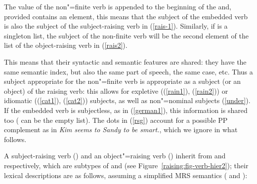 \eal
\label{rsg}
\ex {} \impl
\avm{ [ \argst  \1 \+ < \ldots, [subj & \1 ] >  ]} \label{rais-1}
\ex {}  \impl
\avm{ [ \argst  < NP > \+ \1 \+ < [subj & \1 ] > ]} \label{rais2}
\zl

\noindent
The \subj value of the non"=finite verb is appended to the beginning of the \argst and, provided
 contains an element, this means that the subject of the embedded verb is also the subject
of the subject-raising verb in (\ref{rais-1}). Similarly, if  is a singleton list, the subject of the
non-finite verb will be the second element of the \argst list of the object-raising verb in (\ref{rais2}).

This means that  their syntactic and semantic features are shared: they have the
same semantic index, but also the same part of speech, the same case, etc. Thus a subject appropriate for the
non"=finite verb is appropriate as a subject (or an object) of the raising verb: this allows for
expletive ((\ref{rain1}), (\ref{rain2})) or idiomatic ((\ref{cat1}), (\ref{cat2})) subjects, as well
as non"=nominal subjects (\ref{under}). If the embedded verb is subjectless, as in (\ref{german1}),
this information is shared too ( can be the empty list). The dots in (\ref{rsg}) account for
a possible PP complement as in \textit{Kim seems to Sandy to be smart.}, which we ignore in what
follows.

A subject-raising verb () and an object"=raising verb () inherit from
 and 
 respectively, which are subtypes of  and  (see Figure~\ref{raising:fig-verb-hier2}); their lexical descriptions are as follows,
assuming a simplified MRS semantics (\citealp{CFPS2005a} and ):

